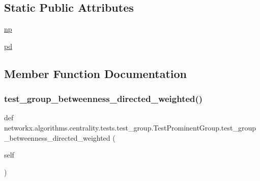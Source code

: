 \subsection*{Static Public Attributes}
\begin{DoxyCompactItemize}
\item 
\hyperlink{classnetworkx_1_1algorithms_1_1centrality_1_1tests_1_1test__group_1_1TestProminentGroup_a2c2a7f50d2e7c00b60b41953e73ede95}{np}
\item 
\hyperlink{classnetworkx_1_1algorithms_1_1centrality_1_1tests_1_1test__group_1_1TestProminentGroup_aeaca3e09b5925a70e8a4a36432c25abd}{pd}
\end{DoxyCompactItemize}


\subsection{Member Function Documentation}
\mbox{\label{classnetworkx_1_1algorithms_1_1centrality_1_1tests_1_1test__group_1_1TestProminentGroup_a61e77447d845799fad57af84f345ebe2}} 
\subsubsection{\texorpdfstring{test\+\_\+group\+\_\+betweenness\+\_\+directed\+\_\+weighted()}{test\_group\_betweenness\_directed\_weighted()}}
{\footnotesize\ttfamily def networkx.\+algorithms.\+centrality.\+tests.\+test\+\_\+group.\+Test\+Prominent\+Group.\+test\+\_\+group\+\_\+betweenness\+\_\+directed\+\_\+weighted (\begin{DoxyParamCaption}\item[{}]{self }\end{DoxyParamCaption})}

